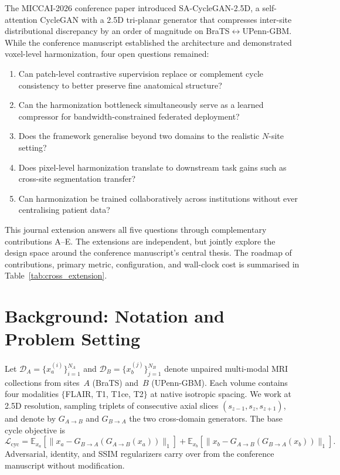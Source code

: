\documentclass[11pt]{article}
\begin{document}
The MICCAI-2026 conference paper introduced SA-CycleGAN-2.5D, a self-attention
CycleGAN with a 2.5D tri-planar generator that compresses inter-site
distributional discrepancy by an order of magnitude on
BraTS$\leftrightarrow$UPenn-GBM. While the conference manuscript established
the architecture and demonstrated voxel-level harmonization, four open
questions remained:
\begin{enumerate}[leftmargin=2em]
  \item Can patch-level contrastive supervision replace or complement cycle
        consistency to better preserve fine anatomical structure?
  \item Can the harmonization bottleneck simultaneously serve as a learned
        compressor for bandwidth-constrained federated deployment?
  \item Does the framework generalise beyond two domains to the realistic
        $N$-site setting?
  \item Does pixel-level harmonization translate to downstream task gains
        such as cross-site segmentation transfer?
  \item Can harmonization be trained collaboratively across institutions
        without ever centralising patient data?
\end{enumerate}

This journal extension answers all five questions through complementary
contributions A--E. The extensions are independent, but jointly explore the
design space around the conference manuscript's central thesis. The roadmap
of contributions, primary metric, configuration, and wall-clock cost is
summarised in Table~\ref{tab:cross_extension}.



\section{Background: Notation and Problem Setting}

Let $\mathcal{D}_A=\{x_a^{(i)}\}_{i=1}^{N_A}$ and
$\mathcal{D}_B=\{x_b^{(j)}\}_{j=1}^{N_B}$ denote unpaired multi-modal MRI
collections from sites~$A$ (BraTS) and~$B$ (UPenn-GBM). Each volume contains
four modalities $\{$FLAIR, T1, T1ce, T2$\}$ at native isotropic spacing.
We work at 2.5D resolution, sampling triplets of consecutive axial slices
$(s_{z-1}, s_z, s_{z+1})$, and denote by $G_{A\to B}$ and $G_{B\to A}$ the
two cross-domain generators. The base cycle objective is
\begin{equation}
  \mathcal{L}_{\mathrm{cyc}} = \mathbb{E}_{x_a}\!\left[\|x_a - G_{B\to A}(G_{A\to B}(x_a))\|_1\right]
                              + \mathbb{E}_{x_b}\!\left[\|x_b - G_{A\to B}(G_{B\to A}(x_b))\|_1\right].
  \label{eq:cycle}
\end{equation}
Adversarial, identity, and SSIM regularizers carry over from the conference
manuscript without modification.
\end{document}
